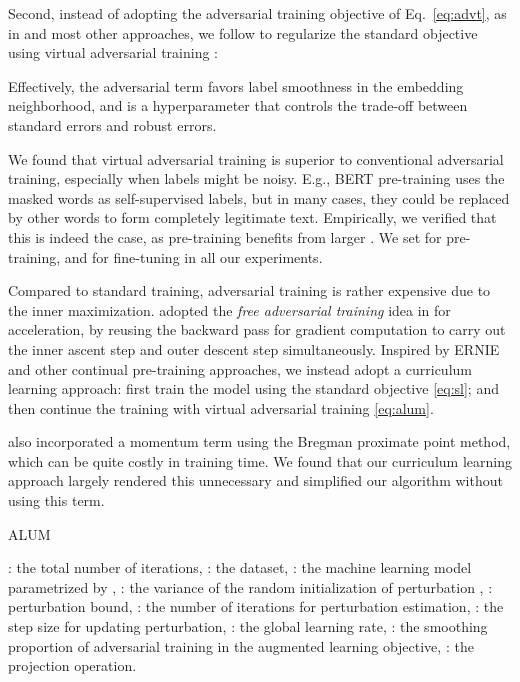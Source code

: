 \documentclass[11pt,a4paper]{article}
\newcommand\DNAME{ALUM}
\begin{document}
Second, instead of adopting the adversarial training objective of Eq.~\ref{eq:advt}, as in  and most other approaches, we follow  to regularize the standard objective using virtual adversarial training \cite{miyato2018virtual}:

Effectively, the adversarial term favors label smoothness in the embedding neighborhood, and  is a hyperparameter that controls the trade-off between standard errors and robust errors. 

We found that virtual adversarial training is superior to conventional adversarial training, especially when labels might be noisy. E.g., BERT pre-training uses the masked words as self-supervised labels, but in many cases, they could be replaced by other words to form completely legitimate text. Empirically, we verified that this is indeed the case, as pre-training benefits from larger . We set  for pre-training, and  for fine-tuning in all our experiments. 


Compared to standard training, adversarial training is rather expensive due to the inner maximization.  adopted the {\em free adversarial training} idea in  for acceleration, by reusing the backward pass for gradient computation to carry out the inner ascent step and outer descent step simultaneously.
Inspired by ERNIE \cite{sun2019ernie} and other continual pre-training approaches, we instead adopt a curriculum learning approach: first train the model using the standard objective \eqref{eq:sl}; and then continue the training with virtual adversarial training \eqref{eq:alum}.

 also incorporated a momentum term using the Bregman proximate point method, which can be quite costly in training time. We found that our curriculum learning approach largely rendered this unnecessary  and simplified our algorithm without using this term.

\begin{algorithm}[!tb]
\caption{{\DNAME}}\label{algo:main}
\begin{algorithmic}[1]
	\INPUT : the total number of iterations, :  the dataset,
	: the machine learning model parametrized by , : the variance of the random initialization of perturbation , : perturbation bound, : the number of iterations for perturbation estimation, : the step size for updating perturbation, : the global learning rate, : the smoothing proportion of adversarial training in the augmented learning objective, : the projection operation. 

	\For{}
	\For{ }
	    \State 
    	\For{}
    	    \State 
    	    \State   
    	\EndFor
	    \State   
	    
	     
	    \State 
	\EndFor
	\EndFor
		\OUTPUT 
\end{algorithmic}
\end{algorithm}
\end{document}
